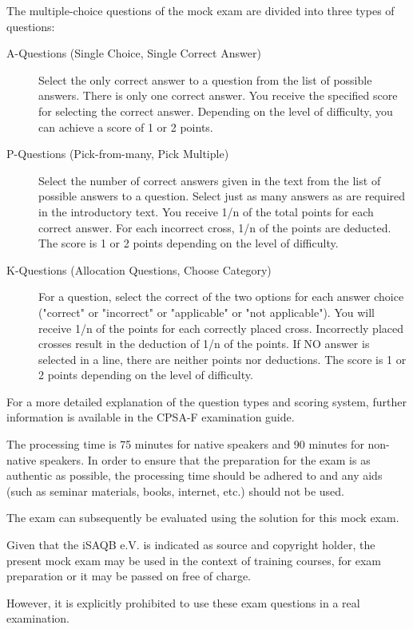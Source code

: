 \documentclass[12pt,a4paper]{article}
\begin{document}
The multiple-choice questions of the mock exam are divided into three
types of questions:

\begin{description}
\item[A-Questions (Single Choice, Single Correct Answer)] Select the
  only correct answer to a question from the list of possible
  answers. There is only one correct answer. You receive the specified
  score for selecting the correct answer. Depending on the level of
  difficulty, you can achieve a score of 1 or 2 points.
\item[P-Questions (Pick-from-many, Pick Multiple)] Select the number
  of correct answers given in the text from the list of possible
  answers to a question. Select just as many answers as are required
  in the introductory text. You receive 1/n of the total points for
  each correct answer. For each incorrect cross, 1/n of the points are
  deducted. The score is 1 or 2 points depending on the level of
  difficulty.
\item[K-Questions (Allocation Questions, Choose Category)] For a
  question, select the correct of the two options for each answer
  choice ("correct" or "incorrect" or "applicable" or "not
  applicable"). You will receive 1/n of the points for each correctly
  placed cross. Incorrectly placed crosses result in the deduction of
  1/n of the points. If NO answer is selected in a line, there are
  neither points nor deductions. The score is 1 or 2 points depending
  on the level of difficulty.
\end{description}

For a more detailed explanation of the question types and scoring
system, further information is available in the CPSA-F examination
guide.

The processing time is 75 minutes for native speakers and 90 minutes
for non-native speakers. In order to ensure that the preparation for
the exam is as authentic as possible, the processing time should be
adhered to and any aids (such as seminar materials, books, internet,
etc.) should not be used.

The exam can subsequently be evaluated using the solution for this
mock exam.

Given that the iSAQB\registered{} e.V. is indicated as source and copyright
holder, the present mock exam may be used in the context of training
courses, for exam preparation or it may be passed on free of charge.

However, it is explicitly prohibited to use these exam questions in a
real examination.

\newpage

\setcounter{examQuestion}{1}

\end{document}
